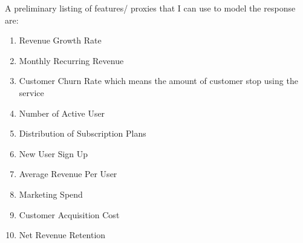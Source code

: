 \documentclass{article}
\begin{document}
A preliminary listing of features/ proxies that I can use to model the response are:
\begin{enumerate}
    \item Revenue Growth Rate
    \item Monthly Recurring Revenue
    \item Customer Churn Rate which means the amount of customer stop using the service
    \item Number of Active User
    \item Distribution of Subscription Plans
    \item New User Sign Up
    \item Average Revenue Per User
    \item Marketing Spend
    \item Customer Acquisition Cost
    \item Net Revenue Retention
\end{enumerate}
\end{document}
